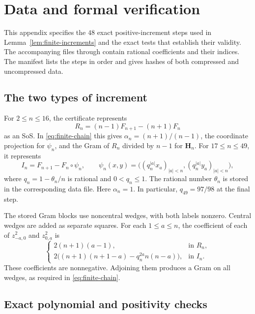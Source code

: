 \section{Data and formal verification}
\label{app:finite-certificates}

This appendix specifies the $48$ exact positive-increment steps used in
Lemma~\ref{lem:finite-increments} and the exact tests that establish
their validity. The accompanying files
 through
 contain rational
coefficients and their indices. The manifest lists the steps in
order and gives hashes of both compressed and uncompressed data.

\subsection{The two types of increment}\label{app:increment-data}

For $2\le n\le16$, the certificate represents
\begin{equation}\label{eq:appendix-normalized-step}
 R_n=(n-1)F_{n+1}-(n+1)F_n
\end{equation}
as an SoS. In \eqref{eq:finite-chain} this gives
$\alpha_n=(n+1)/(n-1)$, the coordinate projection for $\psi_n$,
and the Gram of $R_n$ divided by $n-1$ for $\mathbf H_n$.
For $17\le n\le49$, it represents
\begin{equation}\label{eq:appendix-geometric-step}
 I_n=F_{n+1}-F_n\circ\psi_n,\qquad
 \psi_n(x,y)=
 \bigl((q_n^{|a|}x_a)_{|a|<n},(q_n^{|a|}y_a)_{|a|<n}\bigr),
\end{equation}
where $q_n=1-\theta_n/n$ is rational and $0<q_n\le1$.
The rational number $\theta_n$ is stored in the corresponding data
file. Here $\alpha_n=1$. In particular, $q_{49}=97/98$ at the final step.

The stored Gram blocks use noncentral wedges, with both labels
nonzero. Central wedges are added as separate squares. For each
$1\le a\le n$, the coefficient of each of
$z_{-a,0}^2$ and $z_{0,a}^2$ is
\[
 \begin{cases}
 2(n+1)(a-1),&\text{in }R_n,\\
 2\bigl((n+1)(n+1-a)-q_n^{2a}n(n-a)\bigr),
     &\text{in }I_n.
 \end{cases}
\]
These coefficients are nonnegative. Adjoining them produces a
Gram on all wedges, as required in \eqref{eq:finite-chain}.

\subsection{Exact polynomial and positivity checks}
\label{app:exact-psd-checks}

